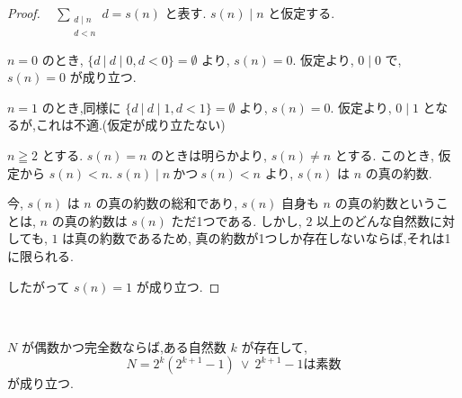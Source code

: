 \begin{proof}~
\(\sum_{\substack{d \mid n\\ d < n}} d = s(n)\) と表す. \(s(n) \mid n\) と仮定する.

\(n = 0\) のとき, \(\{d ~|~ d \mid 0, d < 0\} = \emptyset\) より, \(s(n) = 0\).
仮定より, \(0 \mid 0\) で, \(s(n) = 0\) が成り立つ.

\(n = 1\) のとき,同様に \(\{d ~|~ d \mid 1, d < 1\} = \emptyset\) より, \(s(n) = 0\).
仮定より, \(0 \mid 1\) となるが,これは不適.(仮定が成り立たない)

\(n \geqq 2\) とする. \(s(n) = n\) のときは明らかより, \(s(n) \neq n\) とする.
このとき, 仮定から \(s(n) < n\).
\(s(n) \mid n ~\text{かつ} ~ s(n) < n\) より, \(s(n)\) は \(n\) の真の約数.

今, \(s(n)\) は \(n\) の真の約数の総和であり, \(s(n)\) 自身も \(n\) の真の約数ということは,
\(n\) の真の約数は \(s(n)\) ただ1つである.
しかし, \(2\) 以上のどんな自然数に対しても, \(1\) は真の約数であるため,
真の約数が1つしか存在しないならば,それは1に限られる.

したがって \(s(n) = 1\) が成り立つ.
\end{proof}


\begin{theorem}[Euler]\label{eq_two_pow_mul_prime_mersenne_of_even_perfect}
\leanok{}~\

\(N\) が偶数かつ完全数ならば,ある自然数 \(k\) が存在して,
\[
N = 2^k (2^{k+1} - 1) ~\vee~ 2^{k+1} - 1 \text{は素数}
\]
が成り立つ.

\end{theorem}

